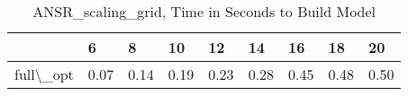 \begin{table}
\centering
\caption{ANSR\_scaling\_grid, Time in Seconds to Build Model}
\label{ANSR_scaling_grid_model_time}
\begin{tabular}{lllllllll}
\toprule
{} &     6 &     8 &    10 &    12 &    14 &    16 &    18 &    20 \\
\midrule
full\textbackslash \_opt &  0.07 &  0.14 &  0.19 &  0.23 &  0.28 &  0.45 &  0.48 &  0.50 \\
\bottomrule
\end{tabular}
\end{table}
